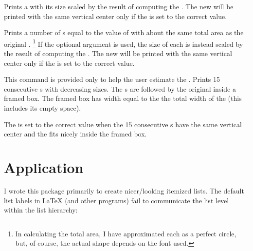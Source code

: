 \documentclass{beery}
\begin{document}
 
\KeepNextPar*

Prints a  with its size scaled by the result of computing the .
The new  will be printed with the same vertical center only if the \textbulletfactor{} is set to the correct value.

  
\KeepNextPar*

Prints a number of s equal to the value of  with about the same total area as the original .%
\footnote
  {%
    In calculating the total area, I have approximated each  as a perfect circle, but, of course, the actual shape depends on the font used.%
  }
If the optional argument is used, the size of each  is instead scaled by the result of computing the .
The new  will be printed with the same vertical center only if the \textbulletfactor{} is set to the correct value.

\KeepNextPar*

This command is provided only to help the user estimate the \textbulletfactor{}.
Prints \num{15} consecutive s with decreasing sizes.
The s are followed by the original  inside a framed box.
The framed box has width equal to the \textbulletfactor{} \texttimes{} the total width of the  (this includes its empty space).

The \textbulletfactor{} is set to the correct value when the 15 consecutive s have the same vertical center and the  fits nicely inside the framed box.


\section{Application}
\label{sec:application}

I wrote this package primarily to create nicer\-/looking itemized lists.
The default list labels in \LaTeX{} (and other programs) fail to communicate the list level within the list hierarchy:
\end{document}
